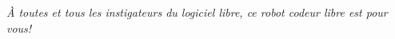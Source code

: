 
\begin{flushright}
  \itshape
    À toutes et tous les instigateurs du logiciel libre, ce robot codeur libre est pour vous!
\end{flushright}

